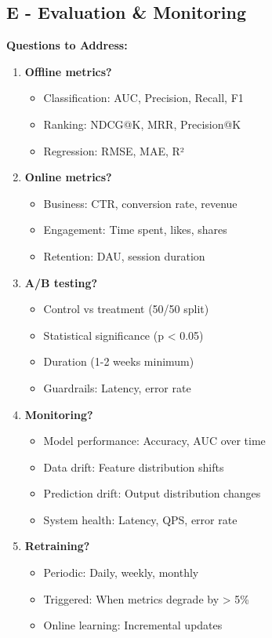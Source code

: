 \documentclass[10pt]{article}
\begin{document}
\subsection{E - Evaluation \& Monitoring}

\textbf{Questions to Address:}
\begin{enumerate}
\item \textbf{Offline metrics?}
\begin{itemize}
\item Classification: AUC, Precision, Recall, F1
\item Ranking: NDCG@K, MRR, Precision@K
\item Regression: RMSE, MAE, R²
\end{itemize}

\item \textbf{Online metrics?}
\begin{itemize}
\item Business: CTR, conversion rate, revenue
\item Engagement: Time spent, likes, shares
\item Retention: DAU, session duration
\end{itemize}

\item \textbf{A/B testing?}
\begin{itemize}
\item Control vs treatment (50/50 split)
\item Statistical significance (p < 0.05)
\item Duration (1-2 weeks minimum)
\item Guardrails: Latency, error rate
\end{itemize}

\item \textbf{Monitoring?}
\begin{itemize}
\item Model performance: Accuracy, AUC over time
\item Data drift: Feature distribution shifts
\item Prediction drift: Output distribution changes
\item System health: Latency, QPS, error rate
\end{itemize}

\item \textbf{Retraining?}
\begin{itemize}
\item Periodic: Daily, weekly, monthly
\item Triggered: When metrics degrade by > 5\%
\item Online learning: Incremental updates
\end{itemize}
\end{enumerate}
\end{document}
